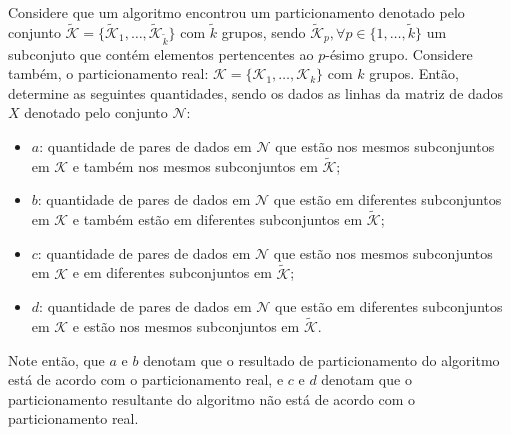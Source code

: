 \documentclass[
    12pt,                %
    oneside,            %
    a4paper,            %
    english,            %
    brazil                %
    ]{abntex2ppgsi}
\begin{document}
Considere que um algoritmo encontrou um particionamento denotado pelo conjunto $\mathscr{\widetilde{K}} = \{\mathcal{\widetilde{K}}_1, \dots, \mathcal{\widetilde{K}}_{\widetilde{k}}\}$ com $\widetilde{k}$ grupos, sendo $\mathcal{\widetilde{K}}_p, \forall p \in \{1, \dots, \widetilde{k}\}$ um subconjuto que contém elementos pertencentes ao $p$-ésimo grupo.
Considere também, o particionamento real: $\mathscr{K} = \{\mathcal{K}_1, \dots, \mathcal{K}_k\}$ com $k$ grupos.
Então, determine as seguintes quantidades, sendo os dados as linhas da matriz de dados $X$ denotado pelo conjunto $\mathcal{N}$:
\begin{itemize}
    \item $a$: quantidade de pares de dados em $\mathcal{N}$ que estão nos mesmos subconjuntos em $\mathscr{K}$ e também nos mesmos subconjuntos em $\mathscr{\widetilde{K}}$;
    \item $b$: quantidade de pares de dados em $\mathcal{N}$ que estão em diferentes subconjuntos em $\mathscr{K}$ e também estão em diferentes subconjuntos em $\mathscr{\widetilde{K}}$;
    \item $c$: quantidade de pares de dados em $\mathcal{N}$ que estão nos mesmos subconjuntos em $\mathscr{K}$ e em diferentes subconjuntos em $\mathscr{\widetilde{K}}$;
    \item $d$: quantidade de pares de dados em $\mathcal{N}$ que estão em diferentes subconjuntos em $\mathscr{K}$ e estão nos mesmos subconjuntos em $\mathscr{\widetilde{K}}$.
\end{itemize}

Note então, que $a$ e $b$ denotam que o resultado de particionamento do algoritmo está de acordo com o particionamento real, e $c$ e $d$ denotam que o particionamento resultante do algoritmo não está de acordo com o particionamento real.
\end{document}
